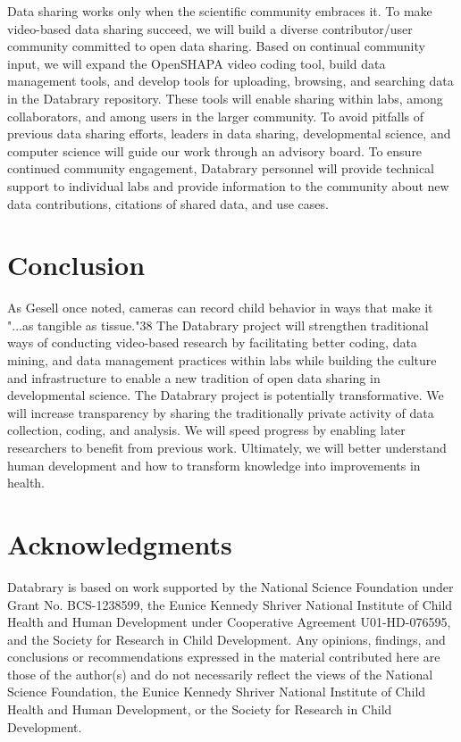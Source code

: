 \documentclass[letterpaper,man,apacite]{apa6}
\begin{document}
Data sharing works only when the scientific community embraces it. 
To make video-based data sharing succeed, we will build a diverse contributor/user community committed to open data sharing. 
Based on continual community input, we will expand the OpenSHAPA video coding tool, build data management tools, and develop tools for uploading, browsing, and searching data in the Databrary repository. 
These tools will enable sharing within labs, among collaborators, and among users in the larger community. To avoid pitfalls of previous data sharing efforts, leaders in data sharing, developmental science, and computer science will guide our work through an advisory board. 
To ensure continued community engagement, Databrary personnel will provide technical support to individual labs and provide information to the community about new data contributions, citations of shared data, and use cases.

\section{Conclusion}

As Gesell once noted, cameras can record child behavior in ways that make it "...as tangible as tissue."38 The Databrary project will strengthen traditional ways of conducting video-based research by facilitating better coding, data mining, and data management practices within labs while building the culture and infrastructure to enable a new tradition of open data sharing in developmental science. The Databrary project is potentially transformative. We will increase transparency by sharing the traditionally private activity of data collection, coding, and analysis. We will speed progress by enabling later researchers to benefit from previous work. Ultimately, we will better understand human development and how to transform knowledge into improvements in health.

\section{Acknowledgments}

Databrary is based on work supported by the National Science Foundation under Grant No. BCS-1238599, the Eunice Kennedy Shriver National Institute of Child Health and Human Development under Cooperative Agreement U01-HD-076595, and the Society for Research in Child Development.
Any opinions, findings, and conclusions or recommendations expressed in the material contributed here are those of the author(s) and do not necessarily reflect the views of the National Science Foundation, the Eunice Kennedy Shriver National Institute of Child Health and Human Development, or the Society for Research in Child Development.


\end{document}
